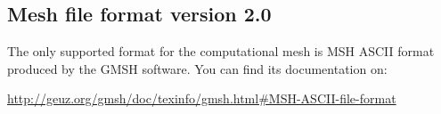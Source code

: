%
%
%
%


\subsection{Mesh file format version 2.0}
The only supported format for the computational mesh is MSH ASCII format produced 
by the GMSH software. You can find its documentation on:

\url{http://geuz.org/gmsh/doc/texinfo/gmsh.html#MSH-ASCII-file-format}


